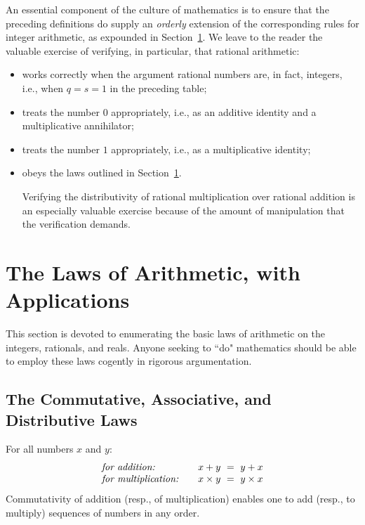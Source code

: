 An essential component of the culture of mathematics is to ensure that the preceding definitions do supply an {\em orderly} extension of the corresponding rules for integer arithmetic, as expounded in Section~\ref{sec:Arithmetic-Laws}.  We leave to the reader the valuable exercise of verifying, in particular, that rational arithmetic:
\begin{itemize}
\item
works correctly when the argument rational numbers are, in fact, integers, i.e., when $q = s = 1$ in the preceding table;
\medskip\item
treats the number $0$ appropriately, i.e., as an additive identity and a multiplicative annihilator;
\medskip\item
treats the number $1$ appropriately, i.e., as a multiplicative identity;
\medskip\item
obeys the laws outlined in Section~\ref{sec:Arithmetic-Laws}.

\smallskip

Verifying the distributivity of rational multiplication over rational addition is an especially valuable exercise because of the amount of manipulation that the verification demands.
\end{itemize}


\section{The Laws of Arithmetic, with Applications}
\label{sec:Arithmetic-Laws}

This section is devoted to enumerating the basic laws of arithmetic on the integers, rationals, and reals.  Anyone seeking to ``do" mathematics should be able to employ these laws cogently in rigorous argumentation.

\subsection{The Commutative, Associative, and Distributive Laws} 

 
 

For all numbers $x$ and $y$:
\[
\begin{array}{llc}
\mbox{\it for addition:}
  & & x+y \ = \ y+x  \index{commutative law!commutativity of addition} \\
\mbox{\it for multiplication:}
  & & x \times y \ = \ y \times x \index{commutative law!commutativity of multiplication}
\end{array}
\]
Commutativity of addition (resp., of multiplication) enables one to add (resp., to multiply) sequences of numbers in any order. 

